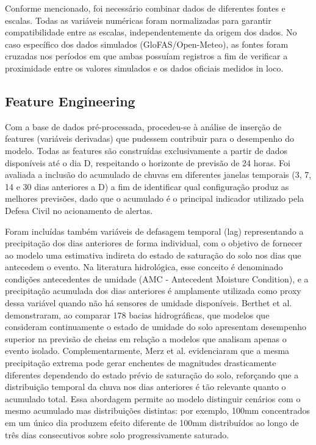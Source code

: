 \documentclass[12pt]{article}
\begin{document}
Conforme mencionado, foi necessário combinar dados de diferentes fontes e escalas. Todas as variáveis numéricas foram normalizadas para garantir compatibilidade entre as escalas, independentemente da origem dos dados. No caso específico dos dados simulados (GloFAS/Open-Meteo), as fontes foram cruzadas nos períodos em que ambas possuíam registros a fim de verificar a proximidade entre os valores simulados e os dados oficiais medidos in loco.

\subsection{Feature Engineering}

Com a base de dados pré-processada, procedeu-se à análise de inserção de features (variáveis derivadas) que pudessem contribuir para o desempenho do modelo. Todas as features são construídas exclusivamente a partir de dados disponíveis até o dia D, respeitando o horizonte de previsão de 24 horas. Foi avaliada a inclusão do acumulado de chuvas em diferentes janelas temporais (3, 7, 14 e 30 dias anteriores a D) a fim de identificar qual configuração produz as melhores previsões, dado que o acumulado é o principal indicador utilizado pela Defesa Civil no acionamento de alertas.

Foram incluídas também variáveis de defasagem temporal (lag) representando a precipitação dos dias anteriores de forma individual, com o objetivo de fornecer ao modelo uma estimativa indireta do estado de saturação do solo nos dias que antecedem o evento. Na literatura hidrológica, esse conceito é denominado condições antecedentes de umidade (AMC - Antecedent Moisture Condition), e a precipitação acumulada dos dias anteriores é amplamente utilizada como proxy dessa variável quando não há sensores de umidade disponíveis. Berthet et al. \cite{berthet2009} demonstraram, ao comparar 178 bacias hidrográficas, que modelos que consideram continuamente o estado de umidade do solo apresentam desempenho superior na previsão de cheias em relação a modelos que analisam apenas o evento isolado. Complementarmente, Merz et al. \cite{merz2025} evidenciaram que a mesma precipitação extrema pode gerar enchentes de magnitudes drasticamente diferentes dependendo do estado prévio de saturação do solo, reforçando que a distribuição temporal da chuva nos dias anteriores é tão relevante quanto o acumulado total. Essa abordagem permite ao modelo distinguir cenários com o mesmo acumulado mas distribuições distintas: por exemplo, 100mm concentrados em um único dia produzem efeito diferente de 100mm distribuídos ao longo de três dias consecutivos sobre solo progressivamente saturado.
\end{document}
